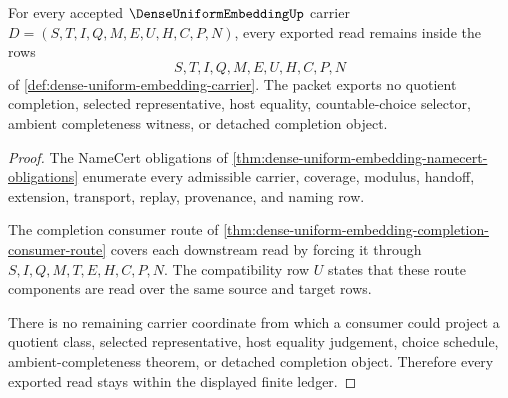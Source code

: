 \begin{theorem}
\label{thm:dense-uniform-embedding-ledger-nonescape}
For every accepted $\DenseUniformEmbeddingUp$ carrier $D=(S,T,I,Q,M,E,U,H,C,P,N)$, every exported read remains inside the rows
$$
S,T,I,Q,M,E,U,H,C,P,N
$$
of \autoref{def:dense-uniform-embedding-carrier}. The packet exports no quotient completion, selected representative, host equality, countable-choice selector, ambient completeness witness, or detached completion object.
\end{theorem}
\begin{proof}
The NameCert obligations of \autoref{thm:dense-uniform-embedding-namecert-obligations} enumerate every admissible carrier, coverage, modulus, handoff, extension, transport, replay, provenance, and naming row.

The completion consumer route of \autoref{thm:dense-uniform-embedding-completion-consumer-route} covers each downstream read by forcing it through $S,I,Q,M,T,E,H,C,P,N$. The compatibility row $U$ states that these route components are read over the same source and target rows.

There is no remaining carrier coordinate from which a consumer could project a quotient class, selected representative, host equality judgement, choice schedule, ambient-completeness theorem, or detached completion object. Therefore every exported read stays within the displayed finite ledger.
\end{proof}

\begin{closurestatus}{\DenseUniformEmbeddingUp}
  \theoryclosure{\seedClosure}
  \formalstatus{\unformalizedV}
\end{closurestatus}
